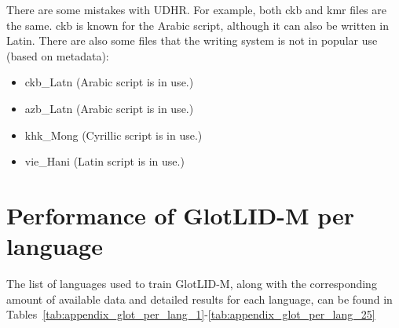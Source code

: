 \documentclass[11pt]{article}
\def\modelname{\mbox{GlotLID-M}\xspace}
\def\seclabel#1{\label{sec:#1}\label{p:#1}}
\begin{document}
There are some mistakes with UDHR. For example, both ckb and kmr files are the same. ckb is known for the Arabic script, although it can also be written in Latin. There are also some files that the writing system is not in popular use (based on \citet{kargaran2023glotscript} metadata):

\begin{itemize}[noitemsep]
  \item ckb\_Latn (Arabic script is in use.)
  \item azb\_Latn (Arabic script is in use.)
  \item khk\_Mong (Cyrillic script is in use.)
  \item vie\_Hani (Latin script is in use.)
\end{itemize}


\section{Performance of \modelname per language}\seclabel{appendix_glot_performance}

The list of languages used to train \modelname, along with the corresponding amount of available data and detailed results for each language, can be found in
Tables~\ref{tab:appendix_glot_per_lang_1}-\ref{tab:appendix_glot_per_lang_25}
\end{document}
